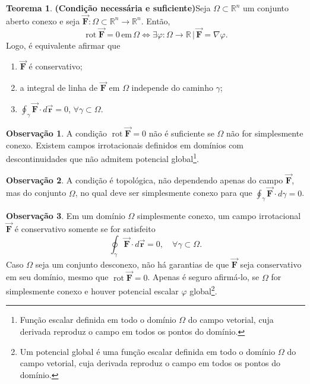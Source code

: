 \documentclass[11pt]{article}
\theoremstyle{definition}
\newtheorem{obs}{Observação}
\newtheorem{teorema}{Teorema}
\begin{document}
	\begin{teorema}\textbf{(Condição necessária e suficiente)}\label{thm:condicao-suficiente}
		Seja $\Omega\subset \mathbb{R}^n$ um conjunto aberto conexo e seja $\vec{\boldsymbol{F}}:\Omega\subset \mathbb{R}^n\to \mathbb{R}^n$. Então,
		\begin{equation*}
			\operatorname{rot}\vec{\boldsymbol{F}}=0\,\text{em}\,\Omega \iff \exists \varphi:\Omega\to \mathbb{R}\,|\,\vec{\boldsymbol{F}}=\nabla \varphi.
		\end{equation*}
		Logo, é equivalente afirmar que
		\begin{enumerate}
			\item $\vec{\boldsymbol{F}}$ é conservativo;
			\item a integral de linha de $\vec{\boldsymbol{F}}$ em $\Omega$ independe do caminho $\gamma$;
			\item $\oint_{\gamma}\vec{\boldsymbol{F}}\cdot d\vec{\boldsymbol{r}}=0$, $\forall\gamma\subset \Omega$.
		\end{enumerate}
	\end{teorema}
	\begin{obs}
		A condição $\operatorname{rot}\vec{\boldsymbol{F}}=0$ não é suficiente se $\Omega$ não for simplesmente conexo. Existem campos irrotacionais definidos em domínios com descontinuidades que não admitem potencial global\footnote{Função escalar definida em todo o domínio $\Omega$ do campo vetorial, cuja derivada reproduz o campo em todos os pontos do domínio.}.
	\end{obs}
	\begin{obs}
		A condição é topológica, não dependendo apenas do campo $\vec{\boldsymbol{F}}$, mas do conjunto $\Omega$, no qual deve ser simplesmente conexo para que $\oint_{\gamma} \vec{\boldsymbol{F}}\cdot d\gamma=0$.
	\end{obs}
	\begin{obs}
		Em um domínio $\Omega$ simplesmente conexo, um campo irrotacional $\vec{\boldsymbol{F}}$ é conservativo somente se for satisfeito
		\begin{equation*}
			\oint_{\gamma} \vec{\boldsymbol{F}}\cdot d\vec{\boldsymbol{r}}=0,\quad \forall \gamma \subset \Omega.
		\end{equation*}
		Caso $\Omega$ seja um conjunto desconexo, não há garantias de que $\vec{\boldsymbol{F}}$ seja conservativo em seu domínio, mesmo que $\operatorname{rot}\vec{\boldsymbol{F}}=0$. Apenas é seguro afirmá-lo, se $\Omega$ for simplesmente conexo e houver potencial escalar $\varphi$ global\footnote{Um potencial global é uma função escalar definida em todo o domínio $\Omega$ do campo vetorial, cuja derivada reproduz o campo em todos os pontos do domínio.}.
	\end{obs}
\end{document}
